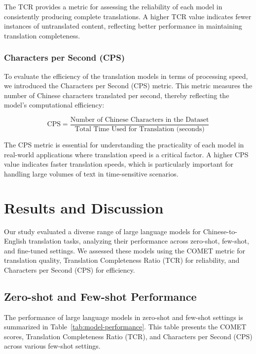 \documentclass[conference]{IEEEtran}
\begin{document}
The TCR provides a metric for assessing the reliability of each model in consistently producing complete translations. A higher TCR value indicates fewer instances of untranslated content, reflecting better performance in maintaining translation completeness.

\subsubsection{Characters per Second (CPS)}

To evaluate the efficiency of the translation models in terms of processing speed, we introduced the Characters per Second (CPS) metric. This metric measures the number of Chinese characters translated per second, thereby reflecting the model’s computational efficiency:

\begin{equation}
\text{CPS} = \frac{\text{Number of Chinese Characters in the Dataset}}{\text{Total Time Used for Translation (seconds)}}
\end{equation}

The CPS metric is essential for understanding the practicality of each model in real-world applications where translation speed is a critical factor. A higher CPS value indicates faster translation speeds, which is particularly important for handling large volumes of text in time-sensitive scenarios.

\section{Results and Discussion}

Our study evaluated a diverse range of large language models for Chinese-to-English translation tasks, analyzing their performance across zero-shot, few-shot, and fine-tuned settings. We assessed these models using the COMET metric for translation quality, Translation Completeness Ratio (TCR) for reliability, and Characters per Second (CPS) for efficiency.

\subsection{Zero-shot and Few-shot Performance}

The performance of large language models in zero-shot and few-shot settings is summarized in Table~\ref{tab:model-performance}. This table presents the COMET scores, Translation Completeness Ratio (TCR), and Characters per Second (CPS) across various few-shot settings.
\end{document}
